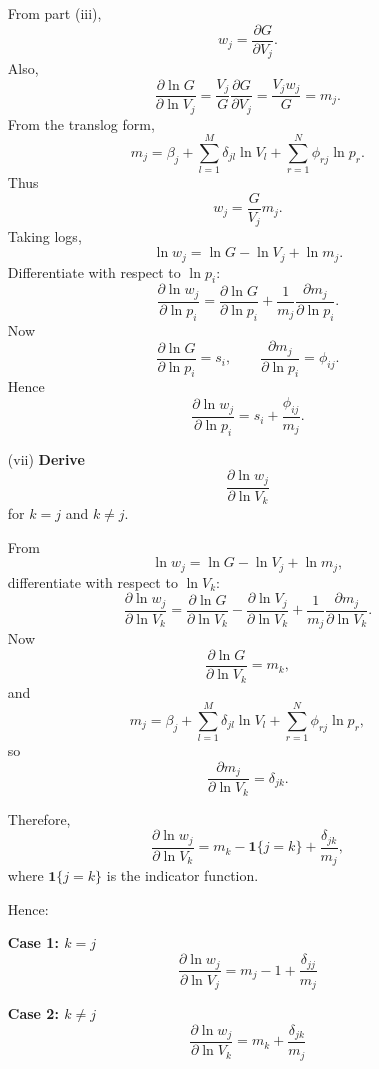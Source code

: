 \begin{enumerate}
From part (iii),
\[
w_j=\frac{\partial G}{\partial V_j}.
\]
Also,
\[
\frac{\partial \ln G}{\partial \ln V_j}
=
\frac{V_j}{G}\frac{\partial G}{\partial V_j}
=
\frac{V_j w_j}{G}
=
m_j.
\]
From the translog form,
\[
m_j
=
\beta_j+\sum_{l=1}^M \delta_{jl}\ln V_l+\sum_{r=1}^N \phi_{rj}\ln p_r.
\]
Thus
\[
w_j=\frac{G}{V_j}m_j.
\]
Taking logs,
\[
\ln w_j=\ln G-\ln V_j+\ln m_j.
\]
Differentiate with respect to $\ln p_i$:
\[
\frac{\partial \ln w_j}{\partial \ln p_i}
=
\frac{\partial \ln G}{\partial \ln p_i}
+
\frac{1}{m_j}\frac{\partial m_j}{\partial \ln p_i}.
\]
Now
\[
\frac{\partial \ln G}{\partial \ln p_i}=s_i,
\qquad
\frac{\partial m_j}{\partial \ln p_i}=\phi_{ij}.
\]
Hence
\[
\boxed{
\frac{\partial \ln w_j}{\partial \ln p_i}
=
s_i+\frac{\phi_{ij}}{m_j}
}.
\]

\bigskip

\item[(vii)] \textbf{Derive}
\[
\frac{\partial \ln w_j}{\partial \ln V_k}
\]
for $k=j$ and $k\neq j$.

From
\[
\ln w_j=\ln G-\ln V_j+\ln m_j,
\]
differentiate with respect to $\ln V_k$:
\[
\frac{\partial \ln w_j}{\partial \ln V_k}
=
\frac{\partial \ln G}{\partial \ln V_k}
-
\frac{\partial \ln V_j}{\partial \ln V_k}
+
\frac{1}{m_j}\frac{\partial m_j}{\partial \ln V_k}.
\]
Now
\[
\frac{\partial \ln G}{\partial \ln V_k}=m_k,
\]
and
\[
m_j
=
\beta_j+\sum_{l=1}^M \delta_{jl}\ln V_l+\sum_{r=1}^N \phi_{rj}\ln p_r,
\]
so
\[
\frac{\partial m_j}{\partial \ln V_k}=\delta_{jk}.
\]

Therefore,
\[
\frac{\partial \ln w_j}{\partial \ln V_k}
=
m_k-\mathbf{1}\{j=k\}+\frac{\delta_{jk}}{m_j},
\]
where $\mathbf{1}\{j=k\}$ is the indicator function.

Hence:

\medskip

\textbf{Case 1: $k=j$}
\[
\boxed{
\frac{\partial \ln w_j}{\partial \ln V_j}
=
m_j-1+\frac{\delta_{jj}}{m_j}
}
\]

\medskip

\textbf{Case 2: $k\neq j$}
\[
\boxed{
\frac{\partial \ln w_j}{\partial \ln V_k}
=
m_k+\frac{\delta_{jk}}{m_j}
}
\]

\end{enumerate}